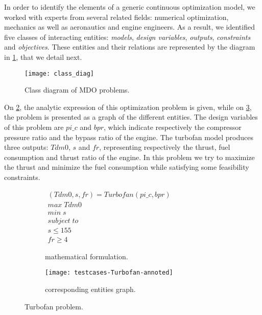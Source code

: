 In order to identify the elements of a generic continuous optimization model, we worked with experts from several related fields: numerical optimization, mechanics as well as aeronautics and engine engineers. As a result, we identified five classes of interacting entities: \emph{models}, \emph{design variables}, \emph{outputs}, \emph{constraints} and \emph{objectives}. These entities and their relations are represented by the diagram in \figurename{} \ref{class_diag}, that we detail next.

\begin{figure}[t]
	\centering
	\texttt{[image: class\_diag]}
	\caption{Class diagram of MDO problems.}
	\label{class_diag}
\end{figure}

On \figurename{} \ref{turbofan:math}, the analytic expression of this optimization problem is given, while on \figurename{} \ref{turbofan:graph}, the problem is presented as a graph of the different entities. The design variables of this problem are $pi\_c$ and $bpr$, which indicate respectively the compressor pressure ratio and the bypass ratio of the engine. The turbofan model produces three outputs: $Tdm0$, $s$ and $fr$, representing respectively the thrust, fuel consumption and thrust ratio of the engine. In this problem we try to maximize the thrust and minimize the fuel consumption while satisfying some feasibility constraints. 

\begin{figure}
\centering
	\begin{subfigure}[b]{0.4\textwidth}
		$\begin{array}{c}
			(Tdm0, s, fr) = Turbofan(pi\_c, bpr) \\
			max \; Tdm0 \\
			min \; s \\
			subject \; to \\
			s \leq 155 \\
			fr \geq 4
		\end{array}$
		\caption{mathematical formulation.}\label{turbofan:math}
	\end{subfigure}
	\hfill%
	\begin{subfigure}[b]{0.55\textwidth}
			\centering
			\texttt{[image: testcases-Turbofan-annoted]}
			\caption{corresponding entities graph.}\label{turbofan:graph}
	\end{subfigure}
\caption{Turbofan problem.}
\label{turbofan}

\end{figure}

